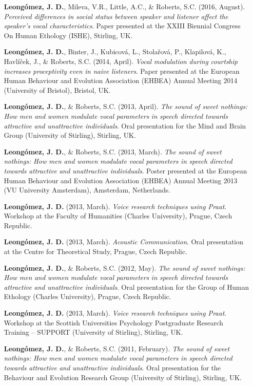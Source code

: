 \documentclass[11pt,a4paper,]{awesome-cv}
\begin{document}
\textbf{Leongómez, J. D.}, Mileva, V.R., Little, A.C., \& Roberts, S.C.
(2016, August). \emph{Perceived differences in social status between
speaker and listener affect the speaker's vocal characteristics}. Paper
presented at the XXIII Biennial Congress On Human Ethology (ISHE),
Stirling, UK.

\textbf{Leongómez, J. D.}, Binter, J., Kubicová, L., Stolařová, P.,
Klapilová, K., Havlíček, J., \& Roberts, S.C. (2014, April). \emph{Vocal
modulation during courtship increases proceptivity even in naive
listeners}. Paper presented at the European Human Behaviour and
Evolution Association (EHBEA) Annual Meeting 2014 (University of
Bristol), Bristol, UK.

\textbf{Leongómez, J. D.}, \& Roberts, S.C. (2013, April). \emph{The
sound of sweet nothings: How men and women modulate vocal parameters in
speech directed towards attractive and unattractive individuals}. Oral
presentation for the Mind and Brain Group (University of Stirling),
Stirling, UK.

\textbf{Leongómez, J. D.}, \& Roberts, S.C. (2013, March). \emph{The
sound of sweet nothings: How men and women modulate vocal parameters in
speech directed towards attractive and unattractive individuals}. Poster
presented at the European Human Behaviour and Evolution Association
(EHBEA) Annual Meeting 2013 (VU University Amsterdam), Amsterdam,
Netherlands.

\textbf{Leongómez, J. D.} (2013, March). \emph{Voice research techniques
using Praat}. Workshop at the Faculty of Humanities (Charles
University), Prague, Czech Republic.

\textbf{Leongómez, J. D.} (2013, March). \emph{Acoustic Communication}.
Oral presentation at the Centre for Theoretical Study, Prague, Czech
Republic.

\textbf{Leongómez, J. D.}, \& Roberts, S.C. (2012, May). \emph{The sound
of sweet nothings: How men and women modulate vocal parameters in speech
directed towards attractive and unattractive individuals}. Oral
presentation for the Group of Human Ethology (Charles University),
Prague, Czech Republic.

\textbf{Leongómez, J. D.} (2013, March). \emph{Voice research techniques
using Praat}. Workshop at the Scottish Universities Psychology
Postgraduate Research Training -- SUPPORT (University of Stirling),
Stirling, UK.

\textbf{Leongómez, J. D.}, \& Roberts, S.C. (2011, February). \emph{The
sound of sweet nothings: How men and women modulate vocal parameters in
speech directed towards attractive and unattractive individuals}. Oral
presentation for the Behaviour and Evolution Research Group (University
of Stirling), Stirling, UK.
\end{document}
